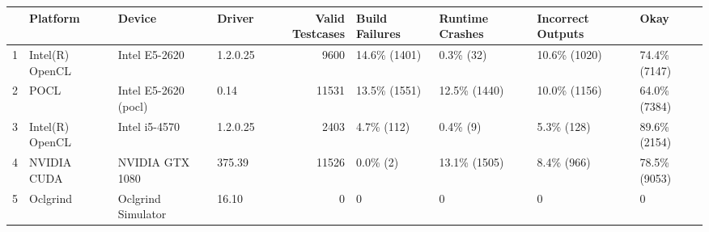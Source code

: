 \begin{tabular}{llllrllll}
\toprule
{} &         Platform &                Device &    Driver &  Valid Testcases & Build Failures & Runtime Crashes & Incorrect Outputs &          Okay \\
\midrule
1 &  Intel(R) OpenCL &         Intel E5-2620 &  1.2.0.25 &             9600 &   14.6\% (1401) &       0.3\% (32) &      10.6\% (1020) &  74.4\% (7147) \\
2 &             POCL &  Intel E5-2620 (pocl) &      0.14 &            11531 &   13.5\% (1551) &    12.5\% (1440) &      10.0\% (1156) &  64.0\% (7384) \\
3 &  Intel(R) OpenCL &         Intel i5-4570 &  1.2.0.25 &             2403 &     4.7\% (112) &        0.4\% (9) &        5.3\% (128) &  89.6\% (2154) \\
4 &      NVIDIA CUDA &       NVIDIA GTX 1080 &    375.39 &            11526 &       0.0\% (2) &    13.1\% (1505) &        8.4\% (966) &  78.5\% (9053) \\
5 &         Oclgrind &    Oclgrind Simulator &     16.10 &                0 &              0 &               0 &                 0 &             0 \\
\bottomrule
\end{tabular}
